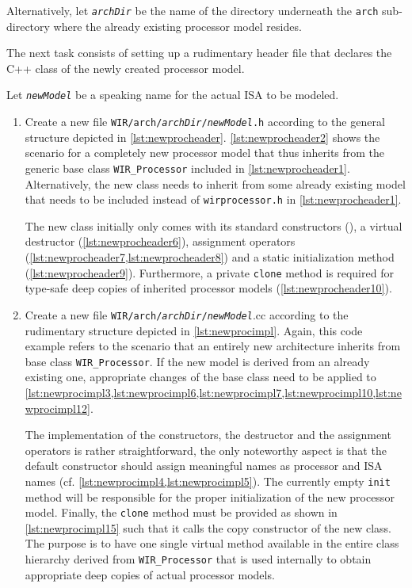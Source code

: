 \begin{wirNote}
Alternatively, let \texttt{\itshape archDir} be the name of the directory underneath the \texttt{arch} sub-directory where the already existing processor model resides.
\end{wirNote}

The next task consists of setting up a rudimentary header file that declares the C++ class of the newly created processor model.
\begin{wirNote}
Let \texttt{\itshape newModel} be a speaking name for the actual \gls{ISA} to be modeled.
\end{wirNote}

\begin{enumerate}[resume]
  \item Create a new file \texttt{WIR/arch/{\itshape archDir}/{\itshape newModel}.h} according to the general structure depicted in \cref{lst:newprocheader}.
  \cref{lst:newprocheader2} shows the scenario for a completely new processor model that thus inherits from the generic base class \texttt{WIR\_Processor} included in \cref{lst:newprocheader1}.
  Alternatively, the new class needs to inherit from some already existing model that needs to be included instead of \texttt{wirprocessor.h} in \cref{lst:newprocheader1}.

  The new class initially only comes with its standard constructors (), a virtual destructor (\cref{lst:newprocheader6}), assignment operators (\cref{lst:newprocheader7,lst:newprocheader8}) and a static initialization method (\cref{lst:newprocheader9}).
  Furthermore, a private \texttt{clone} method is required for type-safe deep copies of inherited processor models (\cref{lst:newprocheader10}).

  \item Create a new file \texttt{WIR/arch/{\itshape archDir}/{\itshape newModel}}.cc according to the rudimentary structure depicted in \cref{lst:newprocimpl}.
  Again, this code example refers to the scenario that an entirely new architecture inherits from base class \texttt{WIR\_Processor}.
  If the new model is derived from an already existing one, appropriate changes of the base class need to be applied to \cref{lst:newprocimpl3,lst:newprocimpl6,lst:newprocimpl7,lst:newprocimpl10,lst:newprocimpl12}.

  The implementation of the constructors, the destructor and the assignment operators is rather straightforward, the only noteworthy aspect is that the default constructor should assign meaningful names as processor and \gls{ISA} names (cf. \cref{lst:newprocimpl4,lst:newprocimpl5}).
  The currently empty \texttt{init} method will be responsible for the proper initialization of the new processor model.
  Finally, the \texttt{clone} method must be provided as shown in \cref{lst:newprocimpl15} such that it calls the copy constructor of the new class.
  The purpose is to have one single virtual method available in the entire class hierarchy derived from \texttt{WIR\_Processor} that is used internally to obtain appropriate deep copies of actual processor models.


\end{enumerate}
